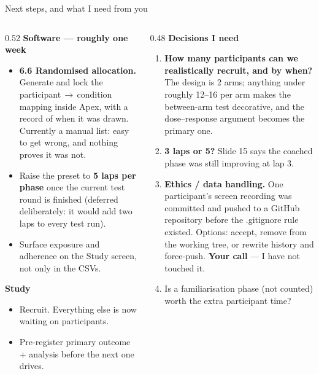 \documentclass[aspectratio=169,10pt]{beamer}
\newcommand{\kw}[1]{\textcolor{cblue}{\textbf{#1}}}
\newcommand{\code}[1]{{\ttfamily\small #1}}
\begin{document}
\begin{frame}{Next steps, and what I need from you}
  \begin{columns}[T]
  \begin{column}{0.52\textwidth}
  \textbf{\normalsize Software --- roughly one week}
  \begin{itemize}\footnotesize
    \item \kw{6.6 Randomised allocation.} Generate and lock the
      participant\,$\rightarrow$\,condition mapping inside Apex, with a record of
      when it was drawn. Currently a manual list: easy to get wrong, and nothing
      proves it was not.
    \item Raise the preset to \kw{5 laps per phase} once the current test round
      is finished (deferred deliberately: it would add two laps to every test run).
    \item Surface exposure and adherence on the Study screen, not only in the CSVs.
  \end{itemize}
  \vspace{0.4em}
  \textbf{\normalsize Study}
  \begin{itemize}\footnotesize
    \item Recruit. Everything else is now waiting on participants.
    \item Pre-register primary outcome + analysis before the next one drives.
  \end{itemize}
  \end{column}
  \begin{column}{0.48\textwidth}
  \textbf{\normalsize Decisions I need}
  \begin{enumerate}\footnotesize
    \item[\textbf{1.}] \kw{How many participants can we realistically recruit, and by
      when?} The design is 2 arms; anything under roughly 12--16 per arm makes the
      between-arm test decorative, and the dose--response argument becomes the
      primary one.
    \item[\textbf{2.}] \kw{3 laps or 5?} Slide 15 says the coached phase was still
      improving at lap 3.
    \item[\textbf{3.}] \kw{Ethics / data handling.} One participant's screen
      recording was committed and pushed to a GitHub repository before the
      \code{.gitignore} rule existed. Options: accept, remove from the working tree,
      or rewrite history and force-push. \textbf{Your call} --- I have not touched it.
    \item[\textbf{4.}] Is a familiarisation phase (not counted) worth the extra
      participant time?
  \end{enumerate}
  \end{column}
  \end{columns}
\end{frame}
\end{document}
